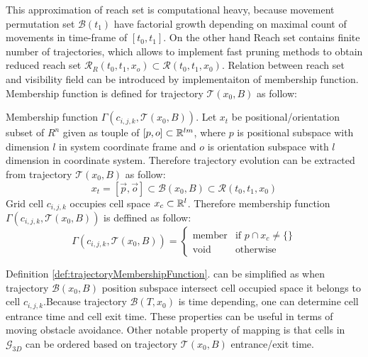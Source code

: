 \noindent This approximation of reach set is computational heavy, because movement permutation set $\mathscr{B}(t_1)$ have factorial growth depending on maximal count of movements in time-frame of $[t_0,t_1]$. On the other hand Reach set contains finite number of trajectories, which allows to implement fast pruning methods to obtain reduced reach set $\mathscr{R}_R(t_0,t_1,x_o)\subset\mathscr{R}(t_0,t_1,x_0)$. Relation between reach set and visibility field can be introduced by implementaiton of membership function. Membership function is defined for trajectory $\mathscr{T}(x_0,B)$ as follow:
\begin{definition}{Membership function $\Gamma(c_{i,j,k},\mathscr{T}(x_0,B))$.}\label{def:trajectoryMembershipFunction}
    Let $x_t$ be positional/orientation subset of $R^n$ given as touple of $[p,o]\subset \mathbb{R}^{lm}$, where $p$ is positional subspace with dimension $l$ in system coordinate frame and $o$ is orientation subspace with $l$ dimension in coordinate system. Therefore trajectory evolution can be extracted from trajectory $\mathscr{T}(x_0,B)$ as follow:
    \begin{equation}
        x_t = [\vec{p},\vec{o}]\subset \mathscr{B}(x_0,B)\subset \mathscr{R}(t_0,t_1,x_0)
    \end{equation}
    Grid cell $c_{i,j,k}$ occupies cell space $x_c \subset \mathbb{R}^l$. Therefore membership function $\Gamma(c_{i,j,k},\mathscr{T}(x_0,B))$ is deffined as follow:
    \begin{equation}
        \Gamma(c_{i,j,k},\mathscr{T}(x_0,B))=
        \begin{cases}
            \text{member} & \text{if } p \cap x_c \neq \{\}\\
            \text{void} & \text{otherwise}
        \end{cases}
    \end{equation} 
\end{definition}
\noindent Definition \ref{def:trajectoryMembershipFunction}. can be simplified as when trajectory $\mathscr{B}(x_0,B)$ position subspace intersect cell occupied space it belongs to cell $c_{i,j,k}$.Because trajectory $\mathscr{B}(T,x_0)$ is time depending, one can determine cell entrance time and cell exit time. These properties can be useful in terms of moving obstacle avoidance. Other notable property of mapping is that cells in $\mathscr{G}_{3D}$ can be ordered based on trajectory $\mathscr{T}(x_0,B)$ entrance/exit time.
